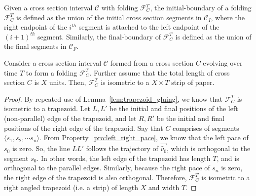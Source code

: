 \begin{definition}
\label{def:interval_folding_boundary}
Given a cross section interval $\mathcal C$ with folding $\mathcal F_C^T$,
the initial-boundary of a folding $\mathcal F_C^T$ is defined as the union of the initial cross section segments in $\mathcal C_I$,
where the right endpoint of the $i^{th}$ segment is attached to the left endpoint of the $(i+1)^{th}$ segment.
Similarly, the final-boundary of $\mathcal F_C^T$ is defined as the union of the final segments in $\mathcal C_F$.
\end{definition}

\begin{theorem}
\label{thm:interval_strip}
Consider a cross section interval $\mathcal C$ formed from a cross section $C$ evolving over time $T$ to form a folding $\mathcal F_C^T$.
Further assume that the total length of cross section $C$ is $X$ units. Then, $\mathcal F_C^T$ is isometric to a $X\times T$ strip of paper.
\end{theorem}
\begin{proof}
By repeated use of Lemma~\ref{lem:trapezoid_gluing}, we know that $\mathcal F_C^T$ is isometric to a trapezoid.
Let $L,L'$ be the initial and final positions of the left (non-parallel) edge of the trapezoid, and
let $R,R'$ be the initial and final positions of the right edge of the trapezoid.
Say that $C$ comprises of segments $ \langle s_1, s_2,\cdots s_n \rangle$.
From Property~\ref{pro:left_right_pace}, we know that the left pace of $s_0$ is zero.
So, the line $LL'$ follows the trajectory of $\vec{\hat v_0}$, which is orthogonal to the segment $s_0$.
In other words, the left edge of the trapezoid has length $T$, and is orthogonal to the parallel edges.
Similarly, because the right pace of $s_n$ is zero, the right edge of the trapezoid is also orthogonal.
Therefore, $\mathcal F_C^T$ is isometric to a right angled trapezoid (i.e. a strip) of length $X$ and width $T$.
\end{proof}

